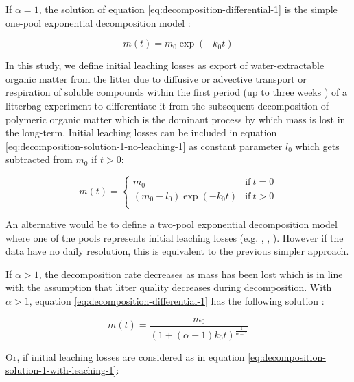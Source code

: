 \documentclass[bg, manuscript]{copernicus}
\begin{document}
If \(\alpha = 1\), the solution of equation \eqref{eq:decomposition-differential-1} is the simple one-pool exponential decomposition model \citep{Frolking.2001}:

\begin{equation}
m(t) = m_0 \exp(-k_0 t)
\label{eq:decomposition-solution-1-no-leaching-1}
\end{equation}

In this study, we define initial leaching losses as export of water-extractable organic matter from the litter due to diffusive or advective transport or respiration of soluble compounds within the first period (up to three weeks \citep{Coulson.1978, Thormann.2001, Moore.2001, Kim.2014, Muller.2023}) of a litterbag experiment to differentiate it from the subsequent decomposition of polymeric organic matter which is the dominant process by which mass is lost in the long-term. Initial leaching losses can be included in equation \eqref{eq:decomposition-solution-1-no-leaching-1} as constant parameter \(l_0\) which gets subtracted from \(m_0\) if \(t>0\):

\begin{equation}
m(t) = \begin{cases}
m_0 & \mathrm{if}~t=0\\
(m_0 - l_0) \exp(-k_0 t) & \mathrm{if}~t>0\\
\end{cases}
\label{eq:decomposition-solution-1-with-leaching-1}
\end{equation}

An alternative would be to define a two-pool exponential decomposition model where one of the pools represents initial leaching losses (e.g. \citet{Yu.2001}, \citet{Rovira.2010}, \citet{Hagemann.2015}). However if the data have no daily resolution, this is equivalent to the previous simpler approach.

If \(\alpha>1\), the decomposition rate decreases as mass has been lost which is in line with the assumption that litter quality decreases during decomposition. With \(\alpha>1\), equation \eqref{eq:decomposition-differential-1} has the following solution \citep{Frolking.2001}:

\begin{equation}
m(t) = \frac{m_0}{(1 + (\alpha - 1) k_0 t)^{\frac{1}{\alpha - 1}}}
\label{eq:decomposition-solution-2-no-leaching-1}
\end{equation}

Or, if initial leaching losses are considered as in equation \eqref{eq:decomposition-solution-1-with-leaching-1}:
\end{document}
